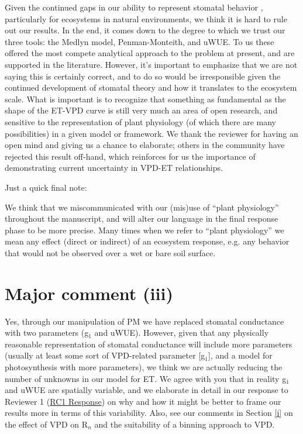 \documentclass[12pt]{article}
\begin{document}
Given the continued gaps in our ability to represent stomatal behavior
\citep{Damour2010}, particularly for ecosystems in natural
environments, we think it is hard to rule out our results. In the end,
it comes down to the degree to which we trust our three tools: the
Medlyn model, Penman-Monteith, and uWUE. To us these offered the most
compete analytical approach to the problem at present, and are
supported in the literature. However, it's important to emphasize that
we are not saying this is certainly correct, and to do so would be
irresponsible given the continued development of stomatal theory and
how it translates to the ecosystem scale. What is important is to
recognize that something as fundamental as the shape of the ET-VPD
curve is still very much an area of open research, and sensitive to
the representation of plant physiology (of which there are many
possibilities) in a given model or framework. We thank the reviewer
for having an open mind and giving us a chance to elaborate; others in
the community have rejected this result off-hand, which reinforces for
us the importance of demonstrating current uncertainty in VPD-ET
relationships.

\vspace{0.2in}
Just a quick final note:

We think that we miscommunicated with our (mis)use of ``plant physiology''
throughout the manuscript, and will alter our language in the final
response phase to be more precise. Many times when we refer to ``plant
physiology'' we mean any effect (direct or indirect) of an ecosystem
response, e.g. any behavior that would not be observed over a wet or
bare soil surface.

\section{Major comment (iii)}
\label{iii}
Yes, through our manipulation of PM we have replaced stomatal
conductance with two parameters (g$_1$ and uWUE). However, given that
any physically reasonable representation of stomatal conductance will
include more parameters (usually at least some sort of VPD-related
parameter [g$_1$], and a model for photosynthesis with more
parameters), we think we are actually reducing the number of unknowns
in our model for ET. We agree with you that in reality g$_1$ and
uWUE are spatially variable, and we elaborate in detail in our
response to Reviewer 1
(\href{https://editor.copernicus.org/index.php/hess-2018-553-AC1.pdf?_mdl=msover_md&_jrl=13&_lcm=oc108lcm109w&_acm=get_comm_file&_ms=72556&c=153745&salt=1660920846993335212}{RC1
  Response})
on why and how it might be better to frame our results more in terms
of this variability. Also, see our comments in Section \ref{i} on the
effect of VPD on R$_n$ and the suitability of a binning approach to
VPD.
\end{document}
